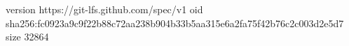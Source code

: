 version https://git-lfs.github.com/spec/v1
oid sha256:fc0923a9c9f22b88c72aa238b904b33b5aa315e6a2fa75f42b76c2c003d2e5d7
size 32864
